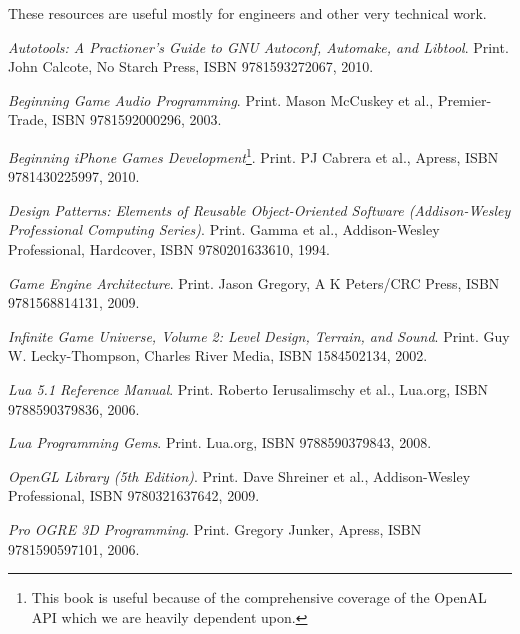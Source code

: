 
These resources are useful mostly for engineers and other very technical work.

\startitemize[4]
\item
{\it Autotools: A Practioner's Guide to GNU Autoconf, Automake, and Libtool}. Print.\crlf
John Calcote, No Starch Press, ISBN 9781593272067, 2010.

\item
{\it Beginning Game Audio Programming}. Print.\crlf
Mason McCuskey et al., Premier-Trade, ISBN 9781592000296, 2003.

\item
{\it Beginning iPhone Games Development}\footnote{This book is useful because of the comprehensive coverage of the OpenAL API which we are heavily dependent upon.}. Print.\crlf
PJ Cabrera et al., Apress, ISBN 9781430225997, 2010.

\item
{\it Design Patterns: Elements of Reusable Object-Oriented Software (Addison-Wesley Professional Computing Series)}. Print.\crlf
Gamma et al., Addison-Wesley Professional, Hardcover, ISBN 9780201633610, 1994.

\item
{\it Game Engine Architecture}. Print.\crlf
Jason Gregory, A K Peters/CRC Press, ISBN 9781568814131, 2009.

\item
{\it Infinite Game Universe, Volume 2: Level Design, Terrain, and Sound}. Print.\crlf
Guy W. Lecky-Thompson, Charles River Media, ISBN 1584502134, 2002.

\item
{\it Lua 5.1 Reference Manual}. Print.\crlf
Roberto Ierusalimschy et al., Lua.org, ISBN 9788590379836, 2006.

\item
{\it Lua Programming Gems}. Print.\crlf
Lua.org, ISBN 9788590379843, 2008.

\item
{\it OpenGL Library (5th Edition)}. Print.\crlf
Dave Shreiner et al., Addison-Wesley Professional, ISBN 9780321637642, 2009.

\item
{\it Pro OGRE 3D Programming}. Print.\crlf
Gregory Junker, Apress, ISBN 9781590597101, 2006.

